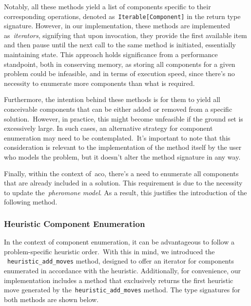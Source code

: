 Notably, all these methods yield a list of components specific to their
corresponding operations, denoted as~\texttt{Iterable[Component]} in the return
type signature. However, in our implementation, these methods are implemented
as~\emph{iterators}, signifying that upon invocation, they provide the first
available item and then pause until the next call to the same method is
initiated, essentially maintaining state. This approach holds significance from
a performance standpoint, both in conserving memory, as storing all components
for a given problem could be infeasible, and in terms of execution speed, since
there's no necessity to enumerate more components than what is required.

Furthermore, the intention behind these methods is for them to yield all
conceivable components that can be either added or removed from a specific
solution.~However, in practice, this might become unfeasible if the ground set
is excessively large. In such cases, an alternative strategy for component
enumeration may need to be contemplated.~It's important to note that this
consideration is relevant to the implementation of the method itself by the user
who models the problem, but it doesn't alter the method signature in any way.


Finally, within the context of~\acrshort{aco}, there's a need to enumerate all
components that are already included in a solution. This requirement is due to
the necessity to update the~\textit{pheromone model}. As a result, this
justifies the introduction of the following method.

\begin{center}
\end{center}

\subsubsection*{Heuristic Component Enumeration}

In the context of component enumeration, it can be advantageous to follow a
problem-specific heuristic order.~With this in mind, we introduced the
~\texttt{heuristic\_add\_moves} method, designed to offer an iterator for components
enumerated in accordance with the heuristic. Additionally, for convenience, our
implementation includes a method that exclusively returns the first heuristic
move generated by the~\texttt{heuristic\_add\_moves} method. The type signatures for
both methods are shown below.

